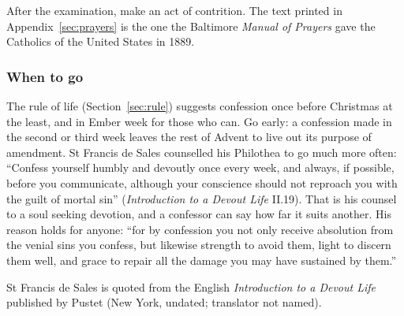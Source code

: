 After the examination, make an act of contrition. The text printed in
Appendix~\ref{sec:prayers} is the one the Baltimore \textit{Manual of Prayers} gave the Catholics
of the United States in 1889.

\subsubsection{When to go}

The rule of life (Section~\ref{sec:rule}) suggests confession once before Christmas at the least,
and in Ember week for those who can. Go early: a confession made in the second or third week leaves the
rest of Advent to live out its purpose of amendment. St Francis de Sales counselled his Philothea to go much more often:
``Confess yourself humbly and devoutly once every week, and always, if possible, before you
communicate, although your conscience should not reproach you with the guilt of mortal sin''
(\textit{Introduction to a Devout Life} II.19). That is his counsel to a soul seeking devotion, and
a confessor can say how far it suits another. His reason holds for anyone: ``for by confession you
not only receive absolution from the venial sins you confess, but likewise strength to avoid them,
light to discern them well, and grace to repair all the damage you may have sustained by them.''

\medskip
{\noindent\small St Francis de Sales is quoted from the English \textit{Introduction to a Devout
Life} published by Pustet (New York, undated; translator not named).\par}
